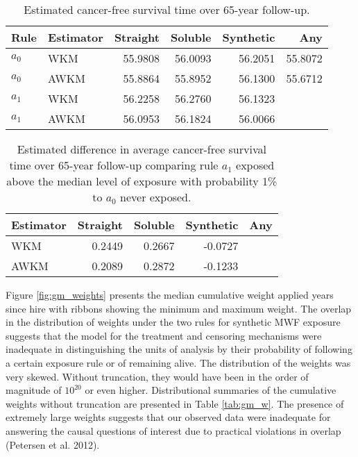 \documentclass[
  11pt,
]{article}
\begin{document}
\begin{table}[H]
\centering
\caption{Estimated cancer-free survival time over 65-year follow-up.} 
\label{tab:gm_survival}
\begin{tabular}{llrrrr}
  \toprule
Rule & Estimator & Straight & Soluble & Synthetic & Any \\ 
  \midrule
$a_0$ & WKM & 55.9808 & 56.0093 & 56.2051 & 55.8072 \\ 
  $a_0$ & AWKM & 55.8864 & 55.8952 & 56.1300 & 55.6712 \\ 
   \midrule
$a_1$ & WKM & 56.2258 & 56.2760 & 56.1323 &  \\ 
  $a_1$ & AWKM & 56.0953 & 56.1824 & 56.0066 &  \\ 
   \bottomrule
\end{tabular}
\end{table}
\begin{table}[H]
\centering
\caption{Estimated difference in average cancer-free survival time over 65-year follow-up comparing rule $a_1$ exposed above the median level of exposure with probability 1\% to $a_0$ never exposed.} 
\label{tab:gm_differences}
\begin{tabular}{lrrrr}
  \toprule
Estimator & Straight & Soluble & Synthetic & Any \\ 
  \midrule
WKM & 0.2449 & 0.2667 & -0.0727 &  \\ 
  AWKM & 0.2089 & 0.2872 & -0.1233 &  \\ 
   \bottomrule
\end{tabular}
\end{table}

Figure \ref{fig:gm_weights} presents the median cumulative weight
applied years since hire with ribbons showing the minimum and maximum
weight. The overlap in the distribution of weights under the two rules
for synthetic MWF exposure suggests that the model for the treatment and
censoring mechanisms were inadequate in distinguishing the units of
analysis by their probability of following a certain exposure rule or of
remaining alive. The distribution of the weights was very skewed.
Without truncation, they would have been in the order of magnitude of
\(10^{20}\) or even higher. Distributional summaries of the cumulative
weights without truncation are presented in Table \ref{tab:gm_w}. The
presence of extremely large weights suggests that our observed data were
inadequate for answering the causal questions of interest due to
practical violations in overlap (Petersen et al. 2012).
\end{document}
